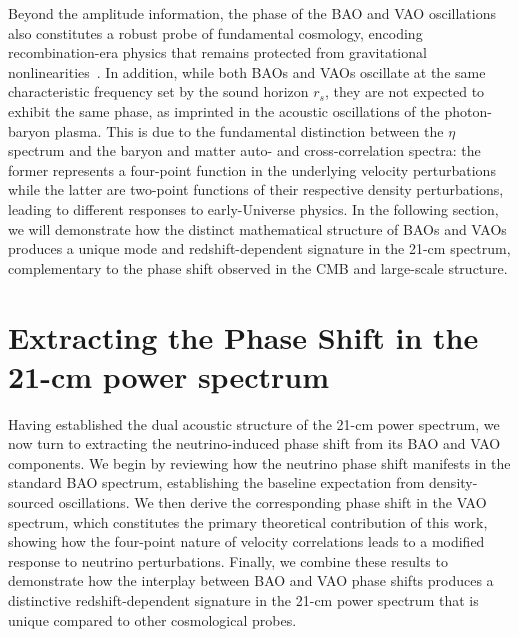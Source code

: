 Beyond the amplitude information, the phase of the BAO and VAO oscillations also constitutes a robust probe of fundamental cosmology, encoding recombination-era physics that remains protected from gravitational nonlinearities~\cite{Pan:2016zla,Baumann:2017lmt,Green:2020fjb}. In addition, while both BAOs and VAOs oscillate at the same characteristic frequency set by the sound horizon $r_s$, they are not expected to exhibit the same phase, as imprinted in the acoustic oscillations of the photon-baryon plasma. This is due to the fundamental distinction between the $\eta$ spectrum and the baryon and matter auto- and cross-correlation spectra: the former represents a four-point function in the underlying velocity perturbations while the latter are two-point functions of their respective density perturbations, leading to different responses to early-Universe physics. In the following section, we will demonstrate how the distinct mathematical structure of BAOs and VAOs produces a unique mode and redshift-dependent signature in the 21-cm spectrum, complementary to the phase shift observed in the CMB and large-scale structure.



\section{Extracting the Phase Shift in the 21-cm power spectrum}\label{sec:ch14-phase_21cm}


Having established the dual acoustic structure of the 21-cm power spectrum, we now turn to extracting the neutrino-induced phase shift from its BAO and VAO components. We begin by reviewing how the neutrino phase shift manifests in the standard BAO spectrum, establishing the baseline expectation from density-sourced oscillations. We then derive the corresponding phase shift in the VAO spectrum, which constitutes the primary theoretical contribution of this work, showing how the four-point nature of velocity correlations leads to a modified response to neutrino perturbations. Finally, we combine these results to demonstrate how the interplay between BAO and VAO phase shifts produces a distinctive redshift-dependent signature in the 21-cm power spectrum that is unique compared to other cosmological probes.

